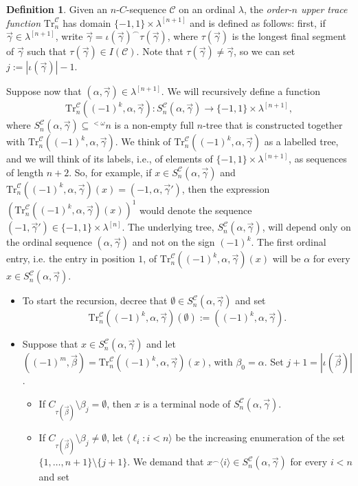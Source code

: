\documentclass{amsart}
\numberwithin{theorem}{section}
\theoremstyle{definition}
\newtheorem{definition}[theorem]{Definition}
\newcommand{\seq}[1]{{\langle{#1}\rangle}}
\renewcommand{\subset}{\subseteq}
\newcommand{\w}{\omega}
\newcommand{\C}{\mathcal{C}}
\newcommand{\Tr}{\mathrm{Tr}}
\begin{document}
\begin{definition}\label{Tr}
Given an $n$-$C$-sequence $\C$ on an ordinal $\lambda$, the \emph{order-$n$ upper trace function} $\Tr^{\C}_n$  
has domain $\{-1,1\} \times \lambda^{[n+1]}$ and is defined as follows: first, if $\vec\gamma\in\lambda^{[n+1]}$, write $\vec{\gamma}=\iota(\vec\gamma)^\smallfrown\tau(\vec\gamma)$, where $\tau(\vec\gamma)$ is the longest final segment of $\vec\gamma$ such that $\tau(\vec\gamma)\in I(\C)$. Note that $\tau(\vec\gamma)\neq\vec\gamma$, so we can set $j:=|\iota(\vec\gamma)|-1$. 

Suppose now that 
$(\alpha,\vec{\gamma}) \in \lambda^{[n+1]}$. We will recursively define a function
\[
\Tr^{\C}_n((-1)^k,\alpha,\vec\gamma):S^{\C}_n(\alpha,\vec\gamma)\to \{-1,1\}\times \lambda^{[n+1]},
\]
where $S^{\C}_n(\alpha,\vec\gamma)\subset {}^{<\w}n$ is a non-empty full $n$-tree that is constructed together with $\Tr^{\C}_n((-1)^k,\alpha,\vec\gamma)$. We think of $\Tr^{\C}_n((-1)^k,\alpha,\vec\gamma)$ as a labelled tree, and we will think of its labels, i.e., of elements of 
$\{-1,1\} \times \lambda^{[n+1]}$, as sequences of length $n+2$. So, for 
example, if $x \in S^{\C}_n(\alpha,\vec{\gamma})$ and 
$\Tr^{\C}_n((-1)^k,\alpha,\vec{\gamma})(x) = (-1,\alpha,\vec{\gamma}')$, 
then the expression $(\Tr^{\C}_n((-1)^k,\alpha,\vec{\gamma})(x))^1$ would denote the 
sequence $(-1,\vec{\gamma}') \in \{-1,1\} \times \lambda^{[n]}$. The underlying tree, $S^{\C}_n(\alpha,\vec\gamma)$, will depend only on the ordinal sequence $(\alpha,\vec\gamma)$ and not on the sign $(-1)^k$. The first ordinal entry, i.e. the entry in position $1$, of $\Tr^{\C}_n((-1)^k,\alpha,\vec\gamma)(x)$ will be $\alpha$ for every $x\in S^{\C}_n(\alpha,\vec\gamma)$.
\begin{itemize}
\item To start the recursion, decree that $\emptyset\in S^{\C}_n(\alpha,\vec\gamma)$ and set
\[
\Tr^{\C}_n((-1)^k,\alpha,\vec\gamma)(\emptyset):=((-1)^k,\alpha,\vec\gamma).
\]
\item Suppose that $x\in S^{\C}_n(\alpha,\vec\gamma)$ and let $((-1)^m,\vec\beta)=\Tr^{\C}_n((-1)^k,\alpha,\vec\gamma)(x)$, with $\beta_0=\alpha$. Set $j+1=|\iota(\vec\beta)|$.
\begin{itemize}
\item If $C_{\tau(\vec\beta)}\setminus\beta_j=\emptyset$, then $x$ is a terminal node of $S^{\C}_n(\alpha,\vec\gamma)$.
\item If $C_{\tau(\vec\beta)}\setminus\beta_j\neq\emptyset$, let $\seq{\ell_i:i<n}$ be the increasing enumeration of the set $\{1,\dots,n+1\}\setminus \{j+1\}$. We demand that $x^\smallfrown\seq{i}\in S^{\C}_n(\alpha,\vec\gamma)$ for every $i<n$ and set

\end{itemize}
\end{itemize}
\end{definition}
\end{document}
